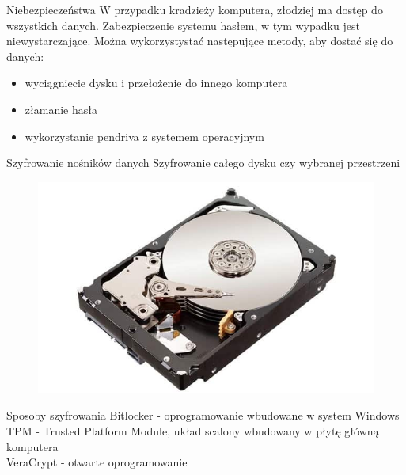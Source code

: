 \documentclass{beamer}
\begin{document}
\begin{frame}{Niebezpieczeństwa}
    W przypadku kradzieży komputera, złodziej ma dostęp do wszystkich danych.
    Zabezpieczenie systemu hasłem, w tym wypadku jest niewystarczające. Można wykorzystystać następujące metody, aby dostać się do danych:\\
    
    \begin{itemize}
        \item wyciągniecie dysku i przełożenie do innego komputera
        \item złamanie hasła
        \item wykorzystanie pendriva z systemem operacyjnym
    \end{itemize}
   
    
\end{frame}

\begin{frame}{Szyfrowanie nośników danych}
Szyfrowanie całego dysku czy wybranej przestrzeni
\newline
    \begin{figure}[H!]
        \centering
        \includegraphics[width=\textwidth]{Dysk.jpg}
        \label{fig:my_label}
    \end{figure}
\end{frame}


\begin{frame}{Sposoby szyfrowania}
    Bitlocker - oprogramowanie wbudowane w system Windows\\
    TPM - Trusted Platform Module, układ scalony wbudowany w płytę główną komputera\\
    VeraCrypt - otwarte oprogramowanie
    
\end{frame}
\end{document}
